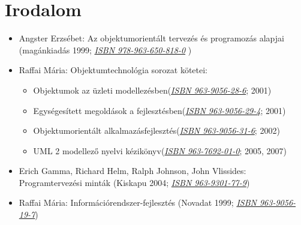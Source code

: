 \documentclass[a4paper,12pt,twoside]{report}
\theoremstyle{definition}
\begin{document}
	\chapter{Irodalom}
	\begin{itemize}
		\item Angster Erzsébet: Az objektumorientált tervezés és programozás alapjai (magánkiadás 1999; \href{https://hu.wikipedia.org/wiki/Speci\%C3\%A1lis:K\%C3\%B6nyvforr\%C3\%A1sok/9789636508180}{\textit{ISBN 978-963-650-818-0}} )
		\item Raffai Mária: Objektumtechnológia sorozat kötetei:
		\begin{itemize}
		 \item Objektumok az üzleti modellezésben(\href{https://hu.wikipedia.org/wiki/Speci\%C3\%A1lis:K\%C3\%B6nyvforr\%C3\%A1sok/9639056286}{\textit{ISBN 963-9056-28-6}}; 2001)
		 \item Egységesített megoldások a fejlesztésben(\href{https://hu.wikipedia.org/wiki/Speci\%C3\%A1lis:K\%C3\%B6nyvforr\%C3\%A1sok/9639056294}{\textit{ISBN 963-9056-29-4}}; 2001)
		 \item Objektumorientált alkalmazásfejlesztés(\href{https://hu.wikipedia.org/wiki/Speci\%C3\%A1lis:K\%C3\%B6nyvforr\%C3\%A1sok/9639056316}{\textit{ISBN 963-9056-31-6}}; 2002)
		 \item UML 2 modellező nyelvi kézikönyv(\href{https://hu.wikipedia.org/wiki/Speci\%C3\%A1lis:K\%C3\%B6nyvforr\%C3\%A1sok/9637692010}{\textit{ISBN 963-7692-01-0}}; 2005, 2007)
	 	\end{itemize}
		\item Erich Gamma, Richard Helm, Ralph Johnson, John Vlissides: Programtervezési minták (Kiskapu 2004; \href{https://hu.wikipedia.org/wiki/Speci\%C3\%A1lis:K\%C3\%B6nyvforr\%C3\%A1sok/9639301779}{\textit{ISBN 963-9301-77-9}})
		\item Raffai Mária: Információrendszer-fejlesztés (Novadat 1999; \href{https://hu.wikipedia.org/wiki/Speci\%C3\%A1lis:K\%C3\%B6nyvforr\%C3\%A1sok/9639056197}{\textit{ISBN 963-9056-19-7}})
	\end{itemize}
	
\end{document}
